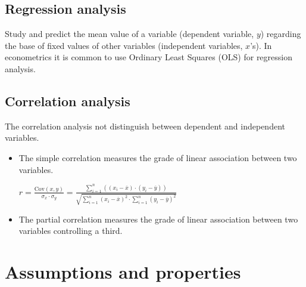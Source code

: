 \documentclass[10pt, a4paper, landscape]{extarticle}
\newcommand{\Cov}{\mathrm{Cov}}
\begin{document}
\begin{multicols}{3}
	\subsection*{Regression analysis}
		Study and predict the mean value of a variable (dependent variable, $y$) regarding the base of fixed values of other variables (independent variables, $x$'s). In econometrics it is common to use Ordinary Least Squares (OLS) for regression analysis.
	\subsection*{Correlation analysis}
		The correlation analysis not distinguish between dependent and independent variables.
		\begin{itemize}[leftmargin=*]
			\item The simple correlation measures the grade of linear association between two variables.
			\begin{center}
				$r = \frac{\Cov(x,y)}{\sigma_x \cdot \sigma_y} = \frac{\sum_{i=1}^n ((x_i - \overline{x}) \cdot (y_i - \overline{y}))}{\sqrt{\sum_{i=1}^n (x_i - \overline{x})^2 \cdot \sum_{i=1}^n (y_i - \overline{y})^2}}$
			\end{center}
			\item The partial correlation measures the grade of linear association between two variables controlling a third.
		\end{itemize}
\columnbreak
\section*{Assumptions and properties}

\end{multicols}
\end{document}
